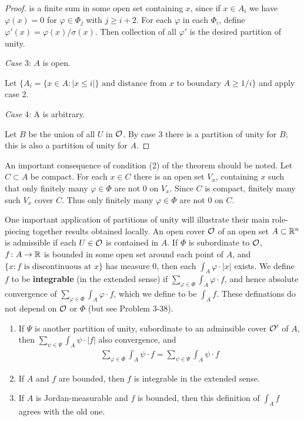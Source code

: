 \begin{proof}
    is a finite sum in some open set containing $x$, since if $x\in A_i$ we have 
    $\varphi(x) = 0$ for $\varphi\in \Phi_j$ with $j\ge i+2$. For each $\varphi$ in 
    each $\Phi_i$, define $\varphi'(x) = \varphi(x)/\sigma(x)$. Then collection of 
    all $\varphi'$ is the desired partition of unity.

    \textit{Case} 3: $A$ is open.\par
    Let $\{A_i = \{x\in A:|x\le i|\} \text{ and distance from } x \text{ to boundary } A\ge 1/i\}$
    and apply case 2.

    \textit{Case} 4: A is arbitrary.\par
    Let $B$ be the union of all $U$ in $\mathcal{O}$. By case 3 there is a partition of unity for
    $B$; this is also a partition of unity for $A$.
\end{proof}


An important consequence of condition (2) of the theorem
should be noted. Let $C \subset A$ be compact. For each $x \in C$
there is an open set $V_x$, containing $x$ such that only finitely
many $\varphi\in \Phi$ are not 0 on $V_x$. Since $C$ is compact, finitely
many such $V_x$ cover $C$. Thus only finitely many $\varphi\in\Phi$ are
not 0 on $C$. 

One important application of partitions of unity will 
illustrate their main role-piecing together results obtained locally.
An open cover $\mathcal{O}$ of an open set $A \subset \mathbb{R}^n$ is admissible if
each $U \in \mathcal{O}$ is contained in $A$. If $\Phi$ is subordinate to $\mathcal{O}$,
$f\colon{} A\to \mathbb{R}$ is bounded in some open set around each point of $A$,
and $\{x: f \text{ is discontinuous at } x\}$ has measure 0, then each
$\int_A\varphi\cdot |x|$ exists. We define $f$ to be \textbf{integrable} (in the extended
sense) if $\sum_{\varphi\in\Phi}^{}{\int_A\varphi\cdot f}$, and hence absolute convergence
of $\sum_{\varphi\in\Phi}^{}{\int_A\varphi\cdot f}$, which we define to be $\int_A f$. These 
definations do not depend on $\mathcal{O}$ or $\Phi$ (but see Problem 3-38).

\begin{theorem}
    \begin{enumerate}[label=\upshape{(\arabic*)}]
        \item If $\Psi$ is another partition of unity, subordinate to an adminsible cover $\mathcal{O}'$ of 
            $A$, then $\sum_{\psi\in\Psi}^{}{\int_A\psi\cdot |f|}$ also convergence, and 
            \begin{align*}
                \sum_{\varphi\in\Phi}^{}{\int_A\psi\cdot f} = \sum_{\psi\in\Psi}^{}{\int_A \psi\cdot f}
            \end{align*}
        \item If $A$ and $f$ are bounded, then $f$ is integrable in the extended sense.
        \item If $A$ is Jordan-measurable and $f$ is bounded, then this definition 
            of $\int_A f$ agrees with the old one.
    \end{enumerate}
\end{theorem}

